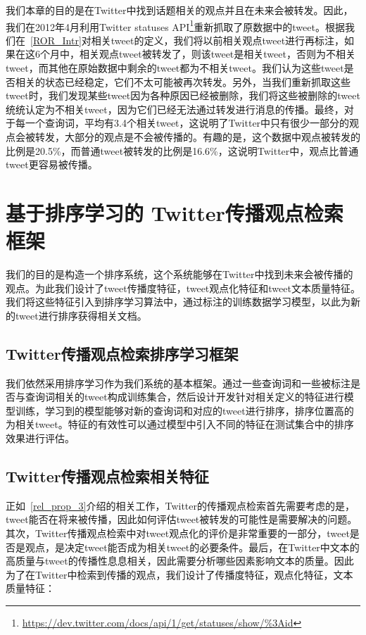 我们本章的目的是在Twitter中找到话题相关的观点并且在未来会被转发。因此，我们在2012年4月利用Twitter statuses API\footnote{\url{https://dev.twitter.com/docs/api/1/get/statuses/show/\%3Aid}}重新抓取了原数据中的tweet。根据我们在~\ref{ROR_Intr}对相关tweet的定义，我们将以前相关观点tweet进行再标注，如果在这6个月中，相关观点tweet被转发了，则该tweet是相关tweet，否则为不相关tweet，而其他在原始数据中剩余的tweet都为不相关tweet。我们认为这些tweet是否相关的状态已经稳定，它们不太可能被再次转发。另外，当我们重新抓取这些tweet时，我们发现某些tweet因为各种原因已经被删除，我们将这些被删除的tweet统统认定为不相关tweet，因为它们已经无法通过转发进行消息的传播。最终，对于每一个查询词，平均有3.4个相关tweet，这说明了Twitter中只有很少一部分的观点会被转发，大部分的观点是不会被传播的。有趣的是，这个数据中观点被转发的比例是20.5\%，而普通tweet被转发的比例是16.6\%，这说明Twitter中，观点比普通tweet更容易被传播。

\section{基于排序学习的 Twitter传播观点检索框架 }
我们的目的是构造一个排序系统，这个系统能够在Twitter中找到未来会被传播的观点。为此我们设计了tweet传播度特征，tweet观点化特征和tweet文本质量特征。我们将这些特征引入到排序学习算法中，通过标注的训练数据学习模型，以此为新的tweet进行排序获得相关文档。

 \subsection{Twitter传播观点检索排序学习框架}
 我们依然采用排序学习作为我们系统的基本框架。通过一些查询词和一些被标注是否与查询词相关的tweet构成训练集合，然后设计开发针对相关定义的特征进行模型训练，学习到的模型能够对新的查询词和对应的tweet进行排序，排序位置高的为相关tweet。特征的有效性可以通过模型中引入不同的特征在测试集合中的排序效果进行评估。

 \subsection{Twitter传播观点检索相关特征}
 正如~\ref{rel_prop_3}介绍的相关工作，Twitter的传播观点检索首先需要考虑的是，tweet能否在将来被传播，因此如何评估tweet被转发的可能性是需要解决的问题。其次，Twitter传播观点检索中对tweet观点化的评价是非常重要的一部分，tweet是否是观点，是决定tweet能否成为相关tweet的必要条件。最后，在Twitter中文本的高质量与tweet的传播性息息相关，因此需要分析哪些因素影响文本的质量。因此为了在Twitter中检索到传播的观点，我们设计了传播度特征，观点化特征，文本质量特征：
 
